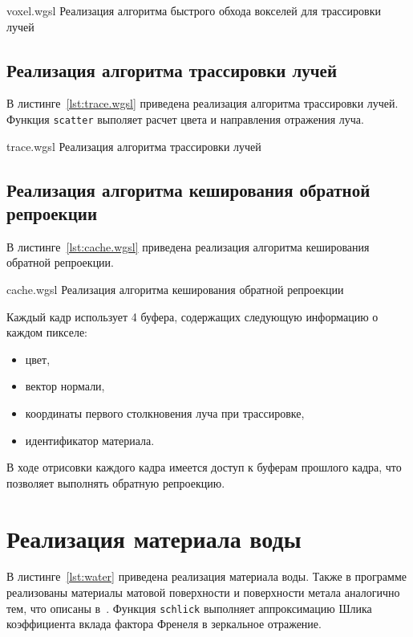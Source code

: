 \pagebreak

    {voxel.wgsl}
    {Реализация алгоритма быстрого обхода вокселей для трассировки лучей}

\subsection{Реализация алгоритма трассировки лучей}

В листинге~\ref{lst:trace.wgsl} приведена реализация алгоритма трассировки лучей.
Функция \verb|scatter| выполяет расчет цвета и направления отражения луча.

    {trace.wgsl}
    {Реализация алгоритма трассировки лучей}

\subsection{Реализация алгоритма кеширования обратной репроекции}

В листинге~\ref{lst:cache.wgsl} приведена реализация алгоритма кеширования обратной репроекции.

    {cache.wgsl}
    {Реализация алгоритма кеширования обратной репроекции}

Каждый кадр использует 4 буфера, содержащих следующую информацию о каждом пикселе:
\begin{itemize}
    \item цвет,
    \item вектор нормали,
    \item координаты первого столкновения луча при трассировке,
    \item идентификатор материала.
\end{itemize}

В ходе отрисовки каждого кадра имеется доступ к буферам прошлого кадра,
что позволяет выполнять обратную репроекцию.

\section{Реализация материала воды}

В листинге~\ref{lst:water} приведена реализация материала воды. Также в программе реализованы
материалы матовой поверхности и поверхности метала аналогично тем, что описаны в~\cite{RTW}.
Функция \verb|schlick| выполняет аппроксимацию Шлика коэффициента вклада фактора Френеля в 
зеркальное отражение.


